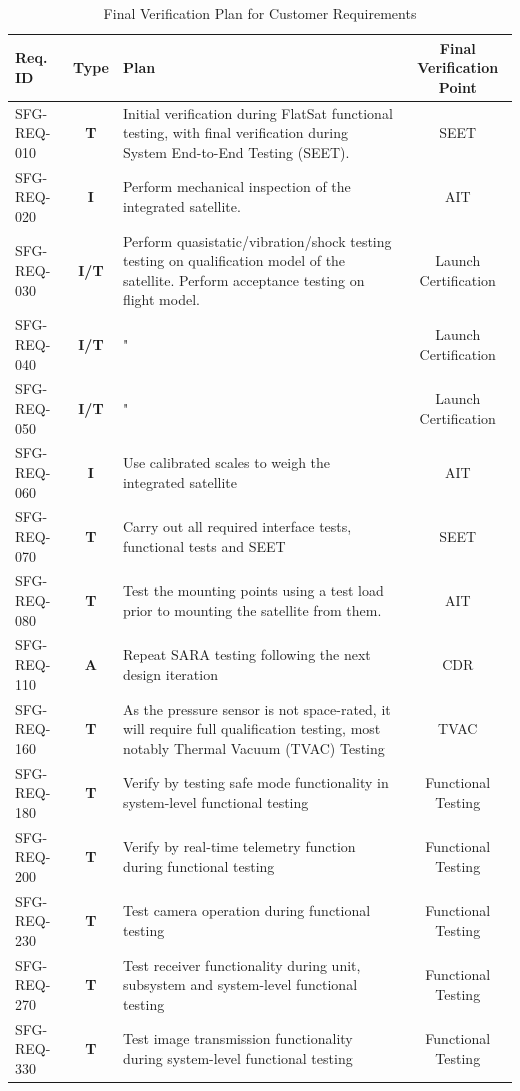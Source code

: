 \documentclass[a4paper, 11pt, conference]{IEEEtran}
\begin{document}
\begin{table}[htbp]
\centering
\caption{Final Verification Plan for Customer Requirements}
\label{tab:Final_Verif_Plan}
\begin{tabularx}{\textwidth}{l c X c}
\toprule
\textbf{Req. ID} & \textbf{Type} & \textbf{Plan} & \textbf{Final Verification Point}\\
\midrule
SFG-REQ-010 & \textbf{T} & Initial verification during FlatSat functional testing, with final verification during System End-to-End Testing (SEET)\label{nom:seet}. & SEET \\
SFG-REQ-020 & \textbf{I} & Perform mechanical inspection of the integrated satellite. & AIT \\
SFG-REQ-030 & \textbf{I/T} & Perform quasistatic/vibration/shock testing testing on qualification model of the satellite. Perform acceptance testing on flight model. & Launch Certification\\
SFG-REQ-040 & \textbf{I/T} & " & Launch Certification \\
SFG-REQ-050 & \textbf{I/T} & " & Launch Certification \\
SFG-REQ-060 & \textbf{I} & Use calibrated scales to weigh the integrated satellite & AIT \\
SFG-REQ-070 & \textbf{T} & Carry out all required interface tests, functional tests and SEET & SEET \\
SFG-REQ-080 & \textbf{T} & Test the mounting points using a test load prior to mounting the satellite from them. & AIT \\
SFG-REQ-110 & \textbf{A} & Repeat SARA\label{nom:sara} testing following the next design iteration & CDR\label{nom:cdr} \\
SFG-REQ-160 & \textbf{T} & As the pressure sensor is not space-rated, it will require full qualification testing, most notably Thermal Vacuum (TVAC) Testing & TVAC \\ 
SFG-REQ-180 & \textbf{T} & Verify by testing safe mode functionality in system-level functional testing & Functional Testing\\
SFG-REQ-200 & \textbf{T} & Verify by real-time telemetry function during functional testing & Functional Testing \\
SFG-REQ-230 & \textbf{T} & Test camera operation during functional testing & Functional Testing \\
SFG-REQ-270 & \textbf{T} & Test receiver functionality during unit, subsystem and system-level functional testing & Functional Testing\\
SFG-REQ-330 & \textbf{T} & Test image transmission functionality during system-level functional testing & Functional Testing \\

\bottomrule
\end{tabularx}
\end{table}
\end{document}
